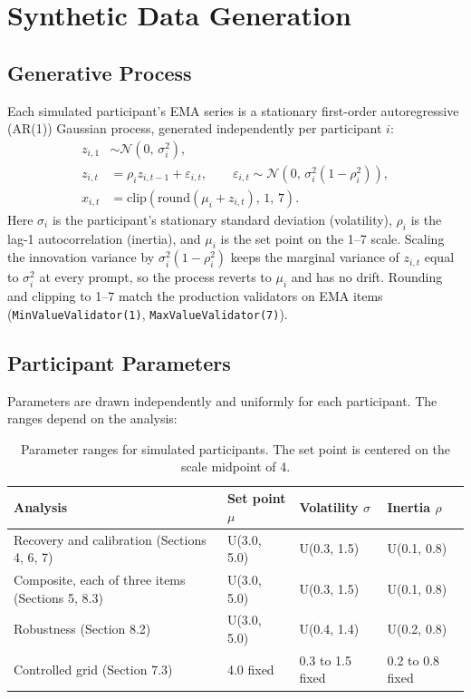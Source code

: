 \documentclass[11pt,letterpaper]{article}
\begin{document}
\section{Synthetic Data Generation}

\subsection{Generative Process}

Each simulated participant's EMA series is a stationary first-order autoregressive (AR(1)) Gaussian process, generated independently per participant $i$:
\begin{align}
z_{i,1} &\sim \mathcal{N}(0,\, \sigma_i^2), \\
z_{i,t} &= \rho_i z_{i,t-1} + \varepsilon_{i,t}, \qquad \varepsilon_{i,t} \sim \mathcal{N}\left(0,\, \sigma_i^2 (1 - \rho_i^2)\right), \\
x_{i,t} &= \text{clip}\left(\text{round}(\mu_i + z_{i,t}),\, 1,\, 7\right).
\end{align}
Here $\sigma_i$ is the participant's stationary standard deviation (volatility), $\rho_i$ is the lag-1 autocorrelation (inertia), and $\mu_i$ is the set point on the 1--7 scale. Scaling the innovation variance by $\sigma_i^2(1 - \rho_i^2)$ keeps the marginal variance of $z_{i,t}$ equal to $\sigma_i^2$ at every prompt, so the process reverts to $\mu_i$ and has no drift. Rounding and clipping to 1--7 match the production validators on EMA items (\texttt{MinValueValidator(1)}, \texttt{MaxValueValidator(7)}).

\subsection{Participant Parameters}

Parameters are drawn independently and uniformly for each participant. The ranges depend on the analysis:

\begin{table}[htbp]
\centering
\small
\begin{tabular}{@{}p{5.2cm}p{2.4cm}p{2.4cm}p{2.4cm}@{}}
\toprule
\textbf{Analysis} & \textbf{Set point $\mu$} & \textbf{Volatility $\sigma$} & \textbf{Inertia $\rho$} \\
\midrule
Recovery and calibration (Sections 4, 6, 7) & U(3.0, 5.0) & U(0.3, 1.5) & U(0.1, 0.8) \\
Composite, each of three items (Sections 5, 8.3) & U(3.0, 5.0) & U(0.3, 1.5) & U(0.1, 0.8) \\
Robustness (Section 8.2) & U(3.0, 5.0) & U(0.4, 1.4) & U(0.2, 0.8) \\
Controlled grid (Section 7.3) & 4.0 fixed & 0.3 to 1.5 fixed & 0.2 to 0.8 fixed \\
\bottomrule
\end{tabular}
\caption{Parameter ranges for simulated participants. The set point is centered on the scale midpoint of 4.}
\end{table}
\end{document}
